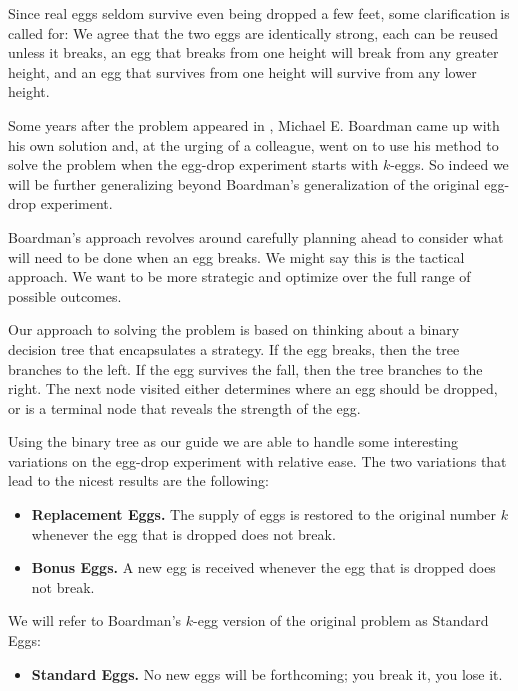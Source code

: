 \documentclass[12pt]{amsart}
\theoremstyle{definition}
\theoremstyle{theorem}
\begin{document}
Since real eggs seldom survive even being dropped a few feet, some clarification
is called for: We agree that the two eggs are identically strong, each can be reused 
unless it breaks, an egg that breaks from one height will break from any greater height,
and an egg that survives from one height will survive from any lower height.

\medskip
Some years after the problem appeared in \cite{konhauser1996way}, Michael
E. Boardman \cite{BoardEgg} came up with his own solution and, at the 
urging of a colleague,
went on to use his method to solve the problem when the
egg-drop experiment starts with $k$-eggs.  So indeed we will be 
further generalizing beyond Boardman's generalization of the 
original egg-drop experiment.

Boardman's approach revolves around carefully planning ahead to 
consider what  will need to be done when an egg breaks. We might say this is the tactical approach. We want to be more strategic and optimize over the full range of possible outcomes.

Our approach to solving the problem is based on thinking about a 
binary
decision tree that encapsulates a strategy. If the egg breaks, then the tree branches to the left. If the egg survives the fall, then the tree branches to the right. The next node visited either determines where an egg should be dropped, or is a terminal node that reveals the strength of the egg.

Using the binary tree as our guide we are able to handle some interesting variations on the egg-drop experiment with relative ease.
The two variations that lead to the nicest results are the following:
\begin{itemize}
\item
{\bf Replacement Eggs.} The supply of eggs is restored to the original number $k$
whenever the egg that is dropped 
does not break.
\item
{\bf Bonus Eggs.}  A new egg  is received whenever the egg that is dropped 
does not break.
\end{itemize}
We will refer to Boardman's $k$-egg version of the original problem as
Standard Eggs:
\begin{itemize}
\item
{\bf Standard Eggs.}  No new eggs will be forthcoming; you break it, you lose it.
\end{itemize}
\end{document}

